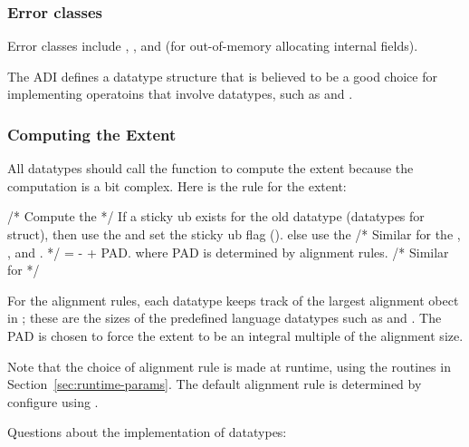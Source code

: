 \documentclass{article}
\begin{document}
\subsubsection{Error classes}
Error classes include ,
, and  (for
out-of-memory allocating internal fields).

The ADI defines a datatype structure that is believed to be a good
choice for implementing operatoins that involve datatypes, such as
 and .

\subsubsection{Computing the Extent}
All datatypes should call the function
 to compute the extent because the
computation is a bit complex.  Here is the rule for the extent:
\begin{algorithm}
/* Compute the  */
If a sticky ub exists for the old datatype (datatypes for struct), then
    use the  and set the sticky ub flag
    ().
else
    use the 
/* Similar for the ,
   ,
      and
   . */
 =  -  + PAD.
where PAD is determined by alignment rules.  
/* Similar for  */

For the alignment rules, each datatype keeps track of the largest
alignment obect in ; these are the
sizes of the predefined language datatypes such as  and
.  The PAD is chosen to force the extent to be an integral
multiple of the alignment size.
\end{algorithm}
Note that the choice of alignment rule is made at runtime, using the
routines in Section~\ref{sec:runtime-params}.  The default alignment
rule is determined by configure using .

Questions about the implementation of datatypes:
\end{document}

